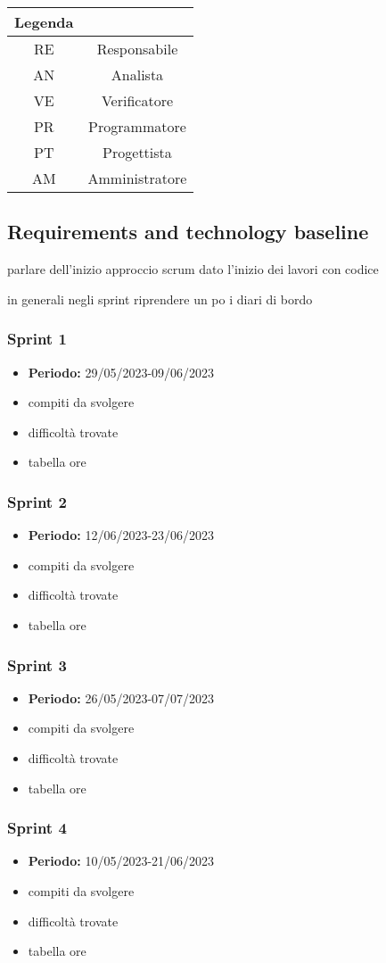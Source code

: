 \begin{longtable}{|c|c|}
    \hline
    \textbf{Legenda} & \\
    \hline
    RE & Responsabile \\
    \hline
    AN & Analista \\
    \hline
    VE & Verificatore \\
    \hline
    PR & Programmatore \\
    \hline
    PT & Progettista \\
    \hline
    AM & Amministratore \\
    \hline
\end{longtable}




\subsection{Requirements and technology baseline}
parlare dell'inizio approccio scrum dato l'inizio dei lavori con codice

in generali negli sprint riprendere un po i diari di bordo
\subsubsection{Sprint 1}
\begin{itemize}
\item \textbf{Periodo:} 29/05/2023-09/06/2023 
\item compiti da svolgere
\item difficoltà trovate
\item tabella ore
\end{itemize}

\subsubsection{Sprint 2}
\begin{itemize}
    \item \textbf{Periodo:} 12/06/2023-23/06/2023 
    \item compiti da svolgere
    \item difficoltà trovate
    \item tabella ore
    \end{itemize}

\subsubsection{Sprint 3}
\begin{itemize}
    \item \textbf{Periodo:} 26/05/2023-07/07/2023 
    \item compiti da svolgere
    \item difficoltà trovate
    \item tabella ore
    \end{itemize}

\subsubsection{Sprint 4}
\begin{itemize}
    \item \textbf{Periodo:} 10/05/2023-21/06/2023 
    \item compiti da svolgere
    \item difficoltà trovate
    \item tabella ore
    \end{itemize}